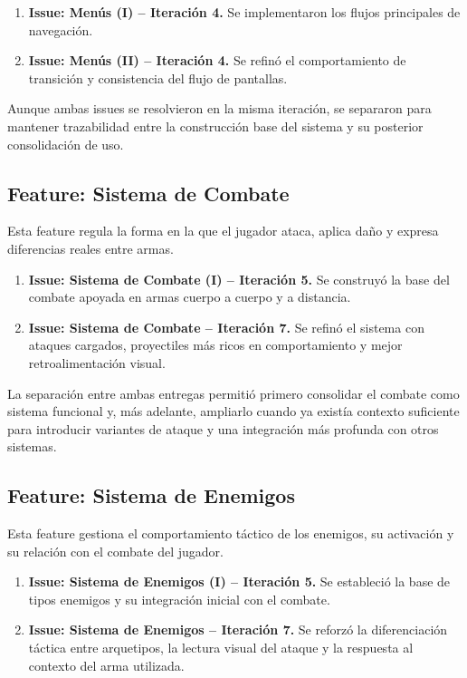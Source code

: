 \begin{enumerate}
\item \textbf{Issue: Menús (I) -- Iteración 4.} Se implementaron los flujos principales de navegación.
\item \textbf{Issue: Menús (II) -- Iteración 4.} Se refinó el comportamiento de transición y consistencia del flujo de pantallas.
\end{enumerate}

Aunque ambas issues se resolvieron en la misma iteración, se separaron para mantener trazabilidad entre
la construcción base del sistema y su posterior consolidación de uso.

\subsection{Feature: Sistema de Combate}
Esta feature regula la forma en la que el jugador ataca, aplica daño y expresa diferencias reales entre armas.

\begin{enumerate}
\item \textbf{Issue: Sistema de Combate (I) -- Iteración 5.} Se construyó la base del combate apoyada en armas cuerpo a cuerpo y a distancia.
\item \textbf{Issue: Sistema de Combate -- Iteración 7.} Se refinó el sistema con ataques cargados, proyectiles más ricos en comportamiento y mejor retroalimentación visual.
\end{enumerate}

La separación entre ambas entregas permitió primero consolidar el combate como sistema funcional y, más adelante,
ampliarlo cuando ya existía contexto suficiente para introducir variantes de ataque y una integración más profunda
con otros sistemas.

\subsection{Feature: Sistema de Enemigos}
Esta feature gestiona el comportamiento táctico de los enemigos, su activación y su relación con el combate del jugador.

\begin{enumerate}
\item \textbf{Issue: Sistema de Enemigos (I) -- Iteración 5.} Se estableció la base de tipos enemigos y su integración inicial con el combate.
\item \textbf{Issue: Sistema de Enemigos -- Iteración 7.} Se reforzó la diferenciación táctica entre arquetipos, la lectura visual del ataque y la respuesta al contexto del arma utilizada.
\end{enumerate}

